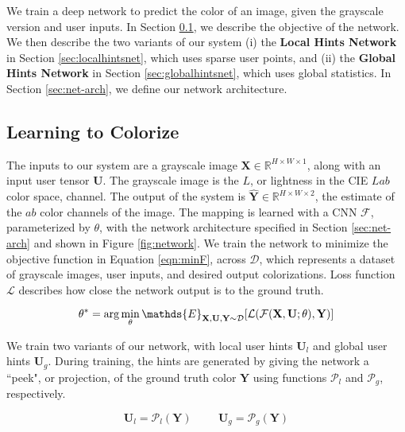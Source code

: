 \documentclass[acmtog,authorversion]{acmart}
\begin{document}
We train a deep network to predict the color of an image, given the grayscale version and user inputs. In Section \ref{sec:learncolor}, we describe the objective of the network. We then describe the two variants of our system (i) the \textbf{Local Hints Network} in Section \ref{sec:localhintsnet}, which uses sparse user points, and (ii) the \textbf{Global Hints Network} in Section \ref{sec:globalhintsnet}, which uses global statistics. In Section \ref{sec:net-arch}, we define our network architecture.

\subsection{Learning to Colorize}
\label{sec:learncolor}

The inputs to our system are a grayscale image $\mathbf{X}\in \mathds{R}^{H\times W \times 1}$, along with an input user tensor $\mathbf{U}$. The grayscale image is the $L$, or lightness in the CIE $Lab$ color space, channel. The output of the system is $\mathbf{\widehat{Y}} \in \mathds{R}^{H\times W \times 2}$, the estimate of the $ab$ color channels of the image. The mapping is learned with a CNN $\mathcal{F}$, parameterized by $\theta$, with the network architecture specified in Section \ref{sec:net-arch} and shown in Figure \ref{fig:network}. We train the network to minimize the objective function in Equation \ref{eqn:minF}, across $\mathcal{D}$, which represents a dataset of grayscale images, user inputs, and desired output colorizations. Loss function $\mathcal{L}$ describes how close the network output is to the ground truth.

\vspace{-3mm}
\begin{equation}
\mathcal{\theta}^{*} = \arg\min_{\mathcal{\theta}} \mathds{E}_{\mathbf{X},\mathbf{U},\mathbf{Y}\sim \mathcal{D}} [ \mathcal{L}(\mathcal{F}(\mathbf{X},\mathbf{U}; \theta),\mathbf{Y}) ] \\
\label{eqn:minF}
\end{equation}
\vspace{-3mm}

We train two variants of our network, with local user hints $\mathbf{U}_l$ and global user hints $\mathbf{U}_g$. During training, the hints are generated by giving the network a ``peek", or projection, of the ground truth color $\mathbf{Y}$ using functions $\mathcal{P}_l$ and $\mathcal{P}_g$, respectively.

\vspace{-3mm}
\begin{equation}
\mathbf{U}_l = \mathcal{P}_l(\mathbf{Y}) \hspace{1cm}
\mathbf{U}_g = \mathcal{P}_g(\mathbf{Y})
\label{eqn:samp}
\end{equation}
\vspace{-3mm}
\end{document}

